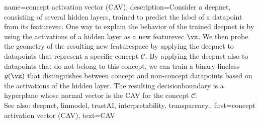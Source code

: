{name={concept activation vector (CAV)},
	description={Consider a \gls{deepnet}, consisting of 
		several hidden \glspl{layer}, trained to predict the \gls{label} of a 
		\gls{datapoint} from its \gls{featurevec}. One way to explain the behavior 
		of the trained \gls{deepnet} is by using the \glspl{activation} of a 
		hidden \gls{layer} as a new \gls{featurevec} $\vz$. We then probe 
		the geometry of the resulting new \gls{featurespace} by applying the 
		\gls{deepnet} to \glspl{datapoint} that represent a specific concept 
		$\mathcal{C}$. By applying the \gls{deepnet} also to \glspl{datapoint} 
		that do not belong to this concept, we can train a binary \gls{linclass} 
		$g(\vz)$ that distinguishes between concept and non-concept \glspl{datapoint} 
		based on the \glspl{activation} of the hidden \gls{layer}. The resulting 
		\gls{decisionboundary} is a \gls{hyperplane} whose normal \gls{vector} is 
		the CAV \cite{kim2018interpretability} for the concept $\mathcal{C}$. 
				\\
		 See also: \gls{deepnet}, \gls{linmodel}, \gls{trustAI}, \gls{interpretability}, \gls{transparency}.}, 
	first={concept activation vector (CAV)},
	text={CAV}
}

